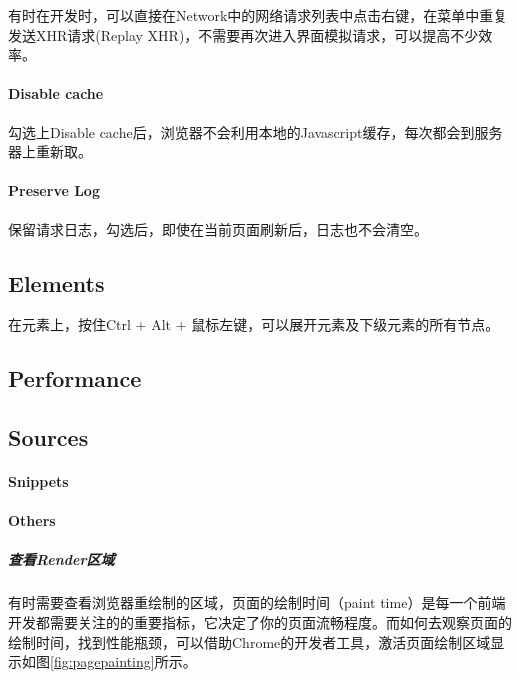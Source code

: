 \documentclass[letter]{book}
\begin{document}
有时在开发时，可以直接在Network中的网络请求列表中点击右键，在菜单中重复发送XHR请求(Replay XHR)，不需要再次进入界面模拟请求，可以提高不少效率。

\paragraph{Disable cache}

勾选上Disable cache后，浏览器不会利用本地的Javascript缓存，每次都会到服务器上重新取。

\paragraph{Preserve Log}

保留请求日志，勾选后，即使在当前页面刷新后，日志也不会清空。


\subsection{Elements}

在元素上，按住Ctrl + Alt + 鼠标左键，可以展开元素及下级元素的所有节点。


\subsection{Performance}



\subsection{Sources}

\paragraph{Snippets}

\paragraph{Others}

\subparagraph{查看Render区域}

有时需要查看浏览器重绘制的区域，页面的绘制时间（paint time）是每一个前端开发都需要关注的的重要指标，它决定了你的页面流畅程度。而如何去观察页面的绘制时间，找到性能瓶颈，可以借助Chrome的开发者工具，激活页面绘制区域显示如图\ref{fig:pagepainting}所示。
\end{document}
